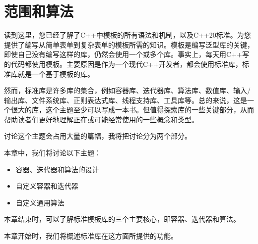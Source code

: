 \chapter{范围和算法}
读到这里，您已经了解了C++中模板的所有语法和机制，以及C++20标准。为您提供了编写从简单表单到复杂表单的模板所需的知识。模板是编写泛型库的关键，即使自己没有编写这样的库，仍然会使用一个或多个库。事实上，每天用C++写的代码都使用模板。主要原因是作为一个现代C++开发者，都会使用标准库，标准库就是一个基于模板的库。

然而，标准库是许多库的集合，例如容器库、迭代器库、算法库、数值库、输入/输出库、文件系统库、正则表达式库、线程支持库、工具库等。总的来说，这是一个很大的库，这个主题至少可以写成一本书。但值得探索库的一些关键部分，从而帮助读者们更好地理解正在或可能经常使用的一些概念和类型。

讨论这个主题会占用大量的篇幅，我将把讨论分为两个部分。

本章中，我们将讨论以下主题：

\begin{itemize}
  \item 容器、迭代器和算法的设计
  \item 自定义容器和迭代器
  \item 自定义通用算法
\end{itemize}

本章结束时，可以了解标准模板库的三个主要核心，即容器、迭代器和算法。

本章开始时，我们将概述标准库在这方面所提供的功能。







